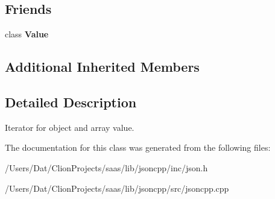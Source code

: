 \subsection*{Friends}
\begin{DoxyCompactItemize}
\item 
class {\bfseries Value}\hypertarget{class_json_1_1_value_iterator_aeceedf6e1a7d48a588516ce2b1983d6f}{}\label{class_json_1_1_value_iterator_aeceedf6e1a7d48a588516ce2b1983d6f}

\end{DoxyCompactItemize}
\subsection*{Additional Inherited Members}


\subsection{Detailed Description}
Iterator for object and array value. 

The documentation for this class was generated from the following files\+:\begin{DoxyCompactItemize}
\item 
/\+Users/\+Dat/\+Clion\+Projects/saas/lib/jsoncpp/inc/json.\+h\item 
/\+Users/\+Dat/\+Clion\+Projects/saas/lib/jsoncpp/src/jsoncpp.\+cpp\end{DoxyCompactItemize}
